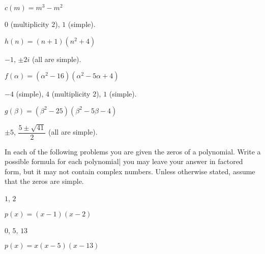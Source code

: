 \begin{exercises}
\begin{problem}[Zeros]
\begin{multicols}{3}
\begin{subproblem}
\begin{shortsolution}
		\end{shortsolution}
	\end{subproblem}
	\begin{subproblem}
		$c(m)=m^3-m^2$
		\begin{shortsolution}
			$0$ (multiplicity $2$), $1$ (simple).
		\end{shortsolution}
	\end{subproblem}
	\begin{subproblem}
		$h(n)=(n+1)(n^2+4)$ 
		\begin{shortsolution}
			$-1$, $\pm 2i$ (all are simple).
		\end{shortsolution}
	\end{subproblem}
	\begin{subproblem}
		$f(\alpha)=(\alpha^2-16)(\alpha^2-5\alpha+4)$ 
		\begin{shortsolution}
			$-4$ (simple), $4$ (multiplicity $2$), $1$ (simple).
		\end{shortsolution}
	\end{subproblem}
	\begin{subproblem}
		$g(\beta)=(\beta^2-25)(\beta^2-5\beta-4)$ 
		\begin{shortsolution}
			$\pm 5$, $\dfrac{5\pm\sqrt{41}}{2}$ (all are simple).
		\end{shortsolution}
	\end{subproblem}
\end{multicols}
\end{problem}
\begin{problem}
In each of the following problems you are given the zeros of a polynomial. 
Write a possible formula for each polynomial| you may leave your 
answer in factored form, but it may not contain complex numbers. Unless
otherwise stated, assume that the zeros are simple.
\begin{multicols}{3}
	\begin{subproblem}
		$1$, $2$ 
		\begin{shortsolution}
			$p(x)=(x-1)(x-2)$
		\end{shortsolution}
	\end{subproblem}
	\begin{subproblem}
		$0$, $5$, $13$ 
		\begin{shortsolution}
			$p(x)=x(x-5)(x-13)$
		\end{shortsolution}
	\end{subproblem}

\end{multicols}
\end{problem}
\end{exercises}
